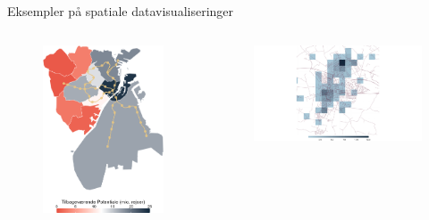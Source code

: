 \documentclass[
  8pt,
  ignorenonframetext,
  aspectratio=169]{beamer}
\newcommand{\columnsbegin}{\begin{columns}}
\newcommand{\columnsend}{\end{columns}}
\begin{document}
\begin{frame}{Eksempler på spatiale datavisualiseringer}
\protect\hypertarget{eksempler-puxe5-spatiale-datavisualiseringer-1}{}
\columnsbegin


\begin{figure}[H]
    \centering
    \includegraphics[width=.70\textwidth]{pictures/potentialeudnyttelse_absolut.png}
\end{figure}


\begin{figure}[H]
    \centering
    \includegraphics[width=.99\textwidth]{pictures/hex_ringsted.png}
\end{figure}

\columnsend
\end{frame}
\end{document}

